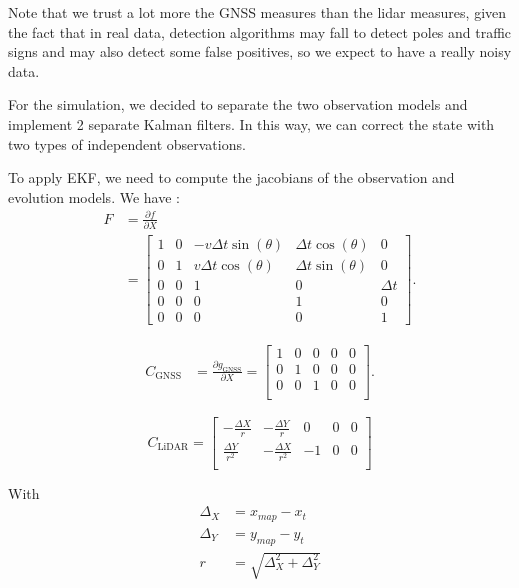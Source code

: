 \documentclass[conference]{IEEEtran}
\begin{document}
\noindent Note that we trust a lot more the GNSS measures than the lidar measures, given the fact that in real data, detection algorithms may fall to detect poles and traffic signs and may also detect some false positives, so we expect to have a really noisy data.

\noindent For the simulation, we decided to separate the two observation models and implement 2 separate Kalman filters. In this way, we can correct the state with two types of independent observations.

To apply EKF, we need to compute the jacobians of the observation and evolution models. We have :
\begin{align*}
    F &= \frac{\partial f}{\partial X} \\ 
    &=
    \begin{bmatrix}
    1 & 0 & -v \Delta t \sin(\theta) & \Delta t \cos(\theta) & 0 \\
    0 & 1 & v \Delta t \cos(\theta) & \Delta t \sin(\theta) & 0 \\
    0 & 0 & 1 & 0 & \Delta t \\
    0 & 0 & 0 & 1 & 0 \\
    0 & 0 & 0 & 0 & 1
    \end{bmatrix}.
\end{align*}

\begin{align*}
    C_{\text{GNSS}} &= \frac{\partial g_\text{GNSS}}{\partial X} =
    \begin{bmatrix}
    1 & 0 & 0 & 0 & 0\\
    0 & 1 & 0 & 0 & 0\\
    0 & 0 & 1 & 0 & 0\\
    \end{bmatrix}.
\end{align*}

\[
C_{\text{LiDAR}} =
\begin{bmatrix}
-\frac{\Delta X}{r} & -\frac{\Delta Y}{r} & 0 & 0 & 0 \\
\frac{\Delta Y}{r^2} & -\frac{\Delta X}{r^2} & -1 & 0 & 0 \\
\end{bmatrix}
\]

With 
\begin{align*}
    \Delta_X &= x_{map} - x_t \\ 
    \Delta_Y &= y_{map} - y_t \\ 
    r &= \sqrt{\Delta_X^2 + \Delta_Y^2}
\end{align*}
\end{document}
